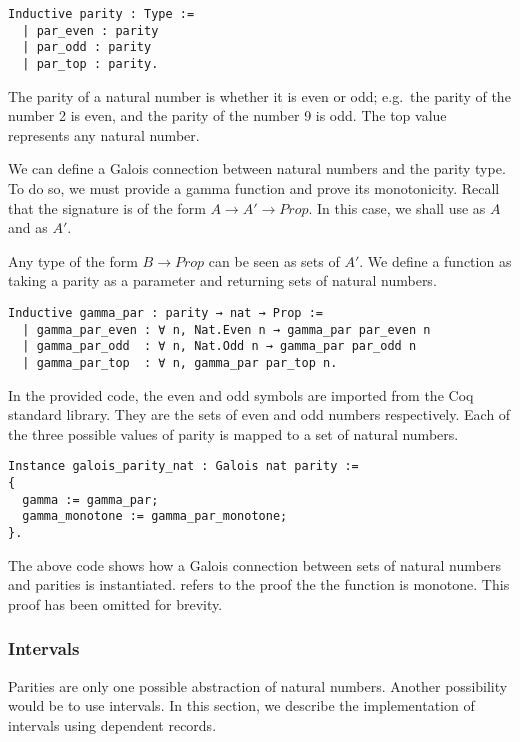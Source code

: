 \begin{listing}
\begin{verbatim}
Inductive parity : Type :=
  | par_even : parity
  | par_odd : parity
  | par_top : parity.
\end{verbatim}
\end{listing}

The parity of a natural number is whether it is even or odd; e.g.\ the parity
of the number 2 is even, and the parity of the number 9 is odd. The top value
represents any natural number.

We can define a Galois connection between natural numbers and the parity type.
To do so, we must provide a gamma function and prove its monotonicity. Recall
that the signature is of the form $A \rightarrow A' \rightarrow Prop$. In this
case, we shall use  as $A$ and  as $A'$.

Any type of the form $B \rightarrow Prop$ can be seen as sets of $A'$. We define
a function  as taking a parity as a parameter and returning
sets of natural numbers.

\begin{listing}
\begin{verbatim}
Inductive gamma_par : parity → nat → Prop :=
  | gamma_par_even : ∀ n, Nat.Even n → gamma_par par_even n
  | gamma_par_odd  : ∀ n, Nat.Odd n → gamma_par par_odd n
  | gamma_par_top  : ∀ n, gamma_par par_top n.
\end{verbatim}
\end{listing}

In the provided code, the even and odd symbols are imported from the Coq
standard library. They are the sets of even and odd numbers respectively. Each
of the three possible values of parity is mapped to a set of natural numbers.

\begin{listing}
\begin{verbatim}
Instance galois_parity_nat : Galois nat parity :=
{
  gamma := gamma_par;
  gamma_monotone := gamma_par_monotone;
}.
\end{verbatim}
\end{listing}

The above code shows how a Galois connection between sets of natural numbers 
and parities is instantiated.  refers to the proof the
the  function is monotone. This proof has been omitted for 
brevity.

\subsubsection{Intervals}
Parities are only one possible abstraction of natural numbers. Another
possibility would be to use intervals. In this section, we describe the
implementation of intervals using dependent records.

